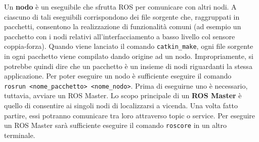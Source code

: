 Un \textbf{nodo} \`{e} un eseguibile che sfrutta ROS per comunicare con altri nodi. 
A ciascuno di tali eseguibili corrispondono dei file sorgente che, raggruppati in pacchetti, consentono la realizzazione di 
funzionalità comuni (ad esempio un pacchetto con i nodi relativi all'interfacciamento a basso livello col sensore coppia-forza).
Quando viene lanciato il comando \verb|catkin_make|, ogni file sorgente in ogni pacchetto viene compilato 
dando origine ad un nodo.
Impropriamente, si potrebbe quindi dire che un pacchetto \`{e} un insieme di nodi riguardanti la stessa applicazione.
Per poter eseguire un nodo \`{e} sufficiente eseguire il comando \\
\verb|rosrun <nome_pacchetto> <nome_nodo>|. 
Prima di eseguirne uno \`{e} necessario, tuttavia, avviare un ROS Master.
Lo scopo principale di un \textbf{ROS Master} \`{e} quello di consentire ai singoli nodi di localizzarsi a vicenda. Una volta 
fatto partire, essi potranno comunicare tra loro attraverso topic o service.
Per eseguire un ROS Master sar\`{a} sufficiente eseguire il comando \verb|roscore| in un altro terminale.
